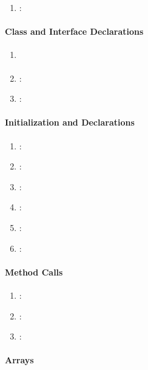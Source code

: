 \begin{enumerate} [resume]
	\item \emph{\checkX}:
\end{enumerate}

\paragraph{Class and Interface Declarations} %
\label{par:class_and_interface_declarations}

\begin{enumerate} [resume]
	\item \emph{\checkY}
	\item \emph{\checkZ}:
	\item \emph{\checkAA}:
\end{enumerate}

\paragraph{Initialization and Declarations} %
\label{par:initialization_and_declarations}

\begin{enumerate} [resume]
	\item \emph{\checkAB}:
	\item \emph{\checkAC}:
	\item \emph{\checkAD}:
	\item \emph{\checkAE}:
	\item \emph{\checkAF}:
	\item \emph{\checkAG}:
\end{enumerate}

\paragraph{Method Calls} %
\label{par:method_calls}

\begin{enumerate} [resume]
	\item \emph{\checkAH}:
	\item \emph{\checkAI}:
	\item \emph{\checkAJ}:
\end{enumerate}

\paragraph{Arrays} %
\label{par:arrays}

